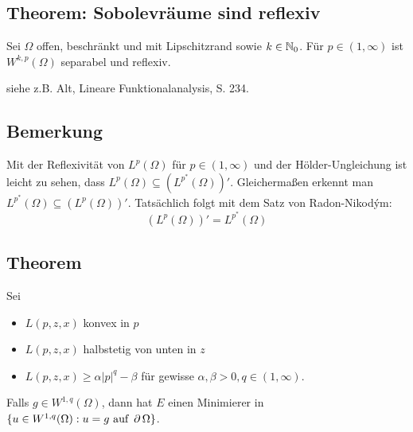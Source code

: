 \subsection{Theorem: Sobolevräume sind reflexiv}
\label{thm_80}
	Sei $\Omega$ offen, beschränkt und mit Lipschitzrand sowie $k \in \mathbb{N}_0$. Für $p \in (1,\infty)$ ist $W^{k,p}(\Omega)$ separabel und reflexiv. \marginnote{[80]}
	
	siehe z.B. Alt, \glqq Lineare Funktionalanalysis\grqq, S. 234.
	
\subsection{Bemerkung}
\label{bem_81}
	Mit der Reflexivität von $L^p(\Omega)$ für $p \in (1,\infty)$  und der Hölder-Ungleichung ist leicht zu sehen, dass $L^p(\Omega) \subseteq (L^{p^*}(\Omega))'$. Gleichermaßen erkennt man $L^{p^*}(\Omega) \subseteq (L^p(\Omega))'$. Tatsächlich folgt mit dem Satz von Radon-Nikodým:
	\[ (L^p(\Omega))' = L^{p^*}(\Omega) \]
	
\subsection{Theorem}
\label{thm_82}
	Sei \marginnote{[82]} \begin{itemize}
	\item $L(p,z,x)$ konvex in $p$
	\item $L(p,z,x)$ halbstetig von unten in $z$
	\item $L(p,z,x) \geq \alpha |p|^q - \beta$ für gewisse $\alpha, \beta > 0, q \in (1,\infty)$.
	\end{itemize}
	Falls $g \in W^{1,q}(\Omega)$, dann hat $E$ einen Minimierer in $\{u \in W^{1,q}(\Omega) : u = g \text{ auf } \operatorname{\partial} \Omega \}$.
	
